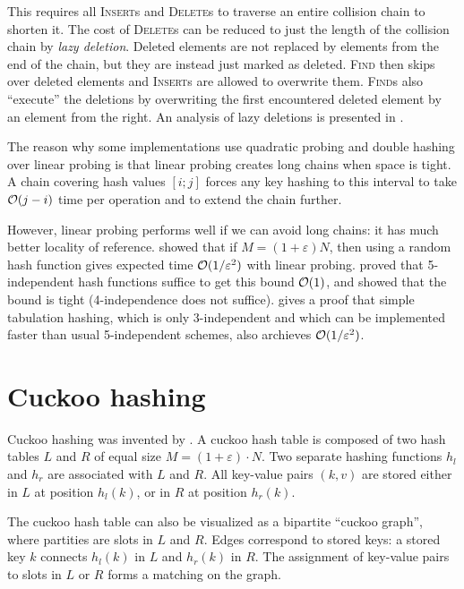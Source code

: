 This requires all \textsc{Insert}s and \textsc{Delete}s to traverse an entire
collision chain to shorten it. The cost of \textsc{Delete}s can be reduced to
just the length of the collision chain by \emph{lazy deletion}. Deleted elements
are not replaced by elements from the end of the chain, but they are instead
just marked as deleted. \textsc{Find} then skips over deleted elements and
\textsc{Insert}s are allowed to overwrite them.
\textsc{Find}s also ``execute'' the deletions by overwriting the first
encountered deleted element by an element from the right. An analysis
of lazy deletions is presented in \cite{lazy-deletions}.

The reason why some implementations use quadratic probing and double hashing
over linear probing is that linear probing creates long chains when space is
tight. A chain covering hash values $[i;j]$ forces any key hashing to this
interval to take $\mathcal{O}(j-i)$ time per operation and to extend the chain further.

However, linear probing performs well if we can avoid long chains: it has
much better locality of reference.
\cite{knuth-linear} showed that if $M=(1+\varepsilon) N$, then using a random
hash function gives expected time $\mathcal{O}(1/\varepsilon^2)$ with linear probing.
\cite{linear-probing-ci} proved that 5-independent hash functions suffice
to get this bound $\mathcal{O}(1)$, and \cite{linear-probing-constant}
showed that the bound is tight (4-independence does not suffice).
\cite{power-of-simple-tab} gives a proof that simple tabulation hashing,
which is only 3-independent and which can be implemented faster than usual
5-independent schemes, also archieves $\mathcal{O}(1/\varepsilon^2)$.

\section{Cuckoo hashing}
\label{sec:cuckoo}

Cuckoo hashing was invented by \cite{cuckoo-hashing}.
A cuckoo hash table is composed of two hash tables $L$ and $R$ of equal size
$M=(1+\varepsilon)\cdot N$.
Two separate hashing functions $h_l$ and $h_r$ are associated with $L$ and $R$.
All key-value pairs $(k,v)$ are stored either in $L$ at position $h_l(k)$, or
in $R$ at position $h_r(k)$.

The cuckoo hash table can also be visualized as a bipartite ``cuckoo graph'',
where partities are slots in $L$ and $R$. Edges correspond to stored keys:
a stored key $k$ connects $h_l(k)$ in $L$ and $h_r(k)$ in $R$. The assignment
of key-value pairs to slots in $L$ or $R$ forms a matching on the graph.

